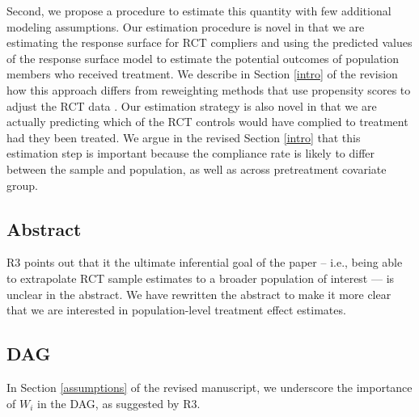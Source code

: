 \documentclass[hidelinks,12pt,letterpaper]{article}
\begin{document}
Second, we propose a procedure to estimate this quantity with few additional modeling assumptions. Our estimation procedure is novel in that we are estimating the response surface for RCT compliers and using the predicted values of the response surface model to estimate the potential outcomes of population members who received treatment. We describe in Section \ref{intro} of the revision how this approach differs from reweighting methods that use propensity scores to adjust the RCT data \citep[e.g.,][]{stuart2011use}. Our estimation strategy is also novel in that we are actually predicting which of the RCT controls would have complied to treatment had they been treated. We argue in the revised Section \ref{intro} that this estimation step is important because the compliance rate is likely to differ between the sample and population, as well as across pretreatment covariate group. 


\subsection{Abstract}


R3 points out that it the ultimate inferential goal of the paper -- i.e., being able to extrapolate RCT sample estimates to a broader population of interest --- is unclear in the abstract. We have rewritten the abstract to make it more clear that we are interested in population-level treatment effect estimates. 

\subsection{DAG}


In Section \ref{assumptions} of the revised manuscript, we underscore the importance of $W_i$ in the DAG, as suggested by R3.

\end{document}
